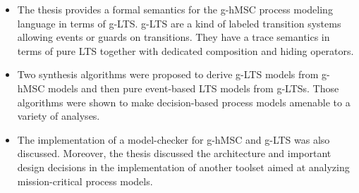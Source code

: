 \begin{itemize}
\item The thesis provides a formal semantics for the g-hMSC process modeling language in terms of g-LTS. g-LTS are a kind of labeled transition systems allowing events or guards on transitions. They have a trace semantics in terms of pure LTS together with dedicated composition and hiding operators.
\item Two synthesis algorithms were proposed to derive g-LTS models from g-hMSC models and then pure event-based LTS models from g-LTSs. Those algorithms were shown to make decision-based process models amenable to a variety of analyses.
\item The implementation of a model-checker for g-hMSC and g-LTS was also discussed. Moreover, the thesis discussed the architecture and important design decisions in the implementation of another toolset aimed at analyzing mission-critical process models.
\end{itemize}
